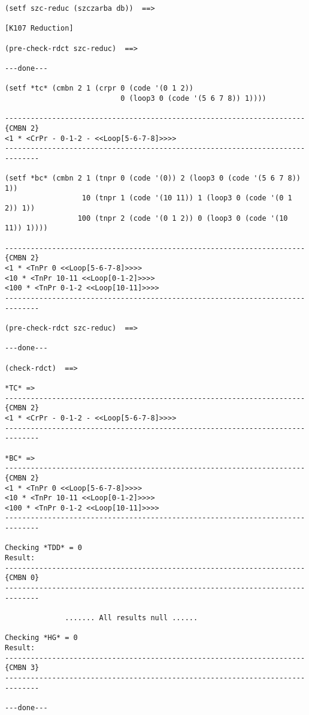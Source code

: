 {\footnotesize\begin{verbatim}
(setf szc-reduc (szczarba db))  ==>

[K107 Reduction]

(pre-check-rdct szc-reduc)  ==>

---done---

(setf *tc* (cmbn 2 1 (crpr 0 (code '(0 1 2))
                           0 (loop3 0 (code '(5 6 7 8)) 1))))

----------------------------------------------------------------------{CMBN 2}
<1 * <CrPr - 0-1-2 - <<Loop[5-6-7-8]>>>>
------------------------------------------------------------------------------

(setf *bc* (cmbn 2 1 (tnpr 0 (code '(0)) 2 (loop3 0 (code '(5 6 7 8)) 1))
                  10 (tnpr 1 (code '(10 11)) 1 (loop3 0 (code '(0 1 2)) 1))
                 100 (tnpr 2 (code '(0 1 2)) 0 (loop3 0 (code '(10 11)) 1))))

----------------------------------------------------------------------{CMBN 2}
<1 * <TnPr 0 <<Loop[5-6-7-8]>>>>
<10 * <TnPr 10-11 <<Loop[0-1-2]>>>>
<100 * <TnPr 0-1-2 <<Loop[10-11]>>>>
------------------------------------------------------------------------------

(pre-check-rdct szc-reduc)  ==>

---done---

(check-rdct)  ==>

*TC* =>
----------------------------------------------------------------------{CMBN 2}
<1 * <CrPr - 0-1-2 - <<Loop[5-6-7-8]>>>>
------------------------------------------------------------------------------

*BC* =>
----------------------------------------------------------------------{CMBN 2}
<1 * <TnPr 0 <<Loop[5-6-7-8]>>>>
<10 * <TnPr 10-11 <<Loop[0-1-2]>>>>
<100 * <TnPr 0-1-2 <<Loop[10-11]>>>>
------------------------------------------------------------------------------

Checking *TDD* = 0
Result:
----------------------------------------------------------------------{CMBN 0}
------------------------------------------------------------------------------

              ....... All results null ......

Checking *HG* = 0
Result:
----------------------------------------------------------------------{CMBN 3}
------------------------------------------------------------------------------

---done---
\end{verbatim}}


